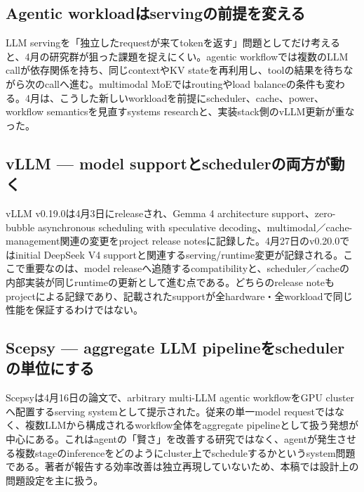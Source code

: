 \begingroup\raggedright
\subsection{Agentic workloadはservingの前提を変える}
\par\endgroup

LLM servingを「独立したrequestが来てtokenを返す」問題としてだけ考えると、4月の研究群が狙った課題を捉えにくい。agentic workflowでは複数のLLM callが依存関係を持ち、同じcontextやKV stateを再利用し、toolの結果を待ちながら次のcallへ進む。multimodal MoEではroutingやload balanceの条件も変わる。4月は、こうした新しいworkloadを前提にscheduler、cache、power、workflow semanticsを見直すsystems researchと、実装stack側のvLLM更新が重なった。\autocite{src-0fc9d11483aa,src-2a6eae37bd39,src-551442a9e215,src-b790ec92aa01,src-d91793d0a6fa,src-e1e959857ced,src-fe12f92c05d7}


\begingroup\raggedright
\subsection{vLLM — model supportとschedulerの両方が動く}
\par\endgroup

vLLM v0.19.0は4月3日にreleaseされ、Gemma 4 architecture support、zero-bubble asynchronous scheduling with speculative decoding、multimodal／cache-management関連の変更をproject release notesに記録した。4月27日のv0.20.0ではinitial DeepSeek V4 supportと関連するserving/runtime変更が記録される。ここで重要なのは、model releaseへ追随するcompatibilityと、scheduler／cacheの内部実装が同じruntimeの更新として進む点である。どちらのrelease noteもprojectによる記録であり、記載されたsupportが全hardware・全workloadで同じ性能を保証するわけではない。\autocite{src-b790ec92aa01,src-fe12f92c05d7}


\begingroup\raggedright
\subsection{Scepsy — aggregate LLM pipelineをschedulerの単位にする}
\par\endgroup

Scepsyは4月16日の論文で、arbitrary multi-LLM agentic workflowをGPU clusterへ配置するserving systemとして提示された。従来の単一model requestではなく、複数LLMから構成されるworkflow全体をaggregate pipelineとして扱う発想が中心にある。これはagentの「賢さ」を改善する研究ではなく、agentが発生させる複数stageのinferenceをどのようにcluster上でscheduleするかというsystem問題である。著者が報告する効率改善は独立再現していないため、本稿では設計上の問題設定を主に扱う。\autocite{src-e1e959857ced}


